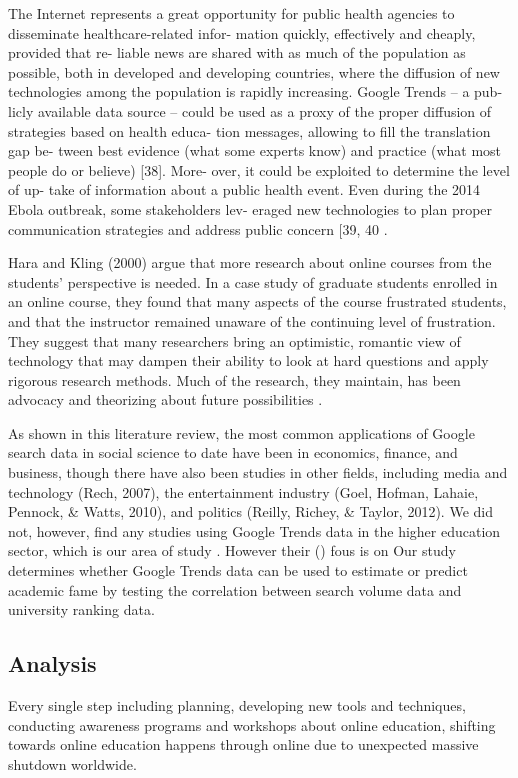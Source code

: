 \documentclass[11pt,a4paper,]{article}
\begin{document}
The Internet represents a great opportunity for public health agencies to disseminate healthcare-related infor- mation quickly, effectively and cheaply, provided that re- liable news are shared with as much of the population as possible, both in developed and developing countries, where the diffusion of new technologies among the population is rapidly increasing. Google Trends -- a pub- licly available data source -- could be used as a proxy of the proper diffusion of strategies based on health educa- tion messages, allowing to fill the translation gap be- tween best evidence (what some experts know) and practice (what most people do or believe) {[}38{]}. More- over, it could be exploited to determine the level of up- take of information about a public health event. Even during the 2014 Ebola outbreak, some stakeholders lev- eraged new technologies to plan proper communication strategies and address public concern {[}39, 40 \autocite{alicino2015assessing}.

Hara and Kling (2000) argue that more research about online courses from the students' perspective is needed. In a case study of graduate students enrolled in an online course, they found that many aspects of the course frustrated students, and that the instructor remained unaware of the continuing level of frustration. They suggest that many researchers bring an optimistic, romantic view of technology that may dampen their ability to look at hard questions and apply rigorous research methods. Much of the research, they maintain, has been advocacy and theorizing about future possibilities \autocite{wallace2003online}.

As shown in this literature review, the most common applications of Google search data in social science to date have been in economics, finance, and business, though there have also been studies in other fields, including media and technology (Rech, 2007), the entertainment industry (Goel, Hofman, Lahaie, Pennock, \& Watts, 2010), and politics (Reilly, Richey, \& Taylor, 2012). We did not, however, find any studies using Google Trends data in the higher education sector, which is our area of study \autocite{vaughan2014web}. However their (\textcite{vaughan2014web}) fous is on Our study determines whether Google Trends data can be used to estimate or predict academic fame by testing the correlation between search volume data and university ranking data.

\hypertarget{analysis}{%
\subsection{Analysis}\label{analysis}}

Every single step including planning, developing new tools and techniques, conducting awareness programs and workshops about online education, shifting towards online education happens through online due to unexpected massive shutdown worldwide.

\printbibliography
\end{document}
